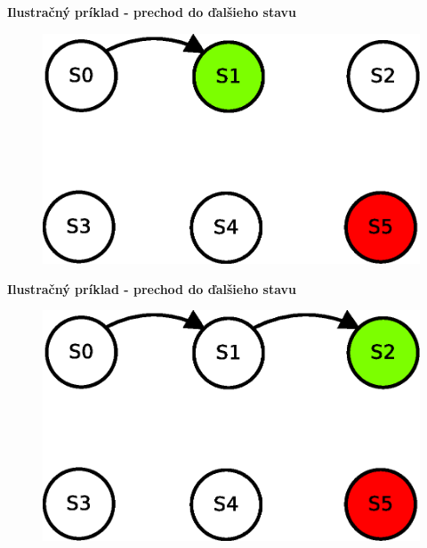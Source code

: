 \documentclass[xcolor=dvipsnames]{beamer}
\begin{document}
\begin{frame}{\bf Ilustračný príklad - prechod do ďalšieho stavu}

\begin{figure}[!htb]
\includegraphics[scale=.5]{../diagrams/q_learning_table_02.eps}
\end{figure}

\end{frame}

\begin{frame}{\bf Ilustračný príklad - prechod do ďalšieho stavu}

\begin{figure}[!htb]
\includegraphics[scale=.5]{../diagrams/q_learning_table_03.eps}
\end{figure}

\end{frame}
\end{document}
